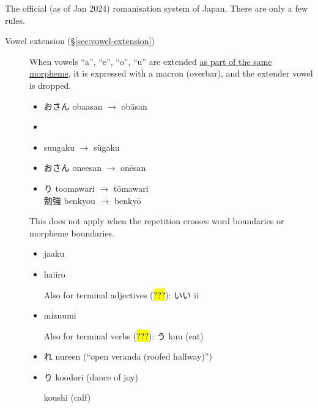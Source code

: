 \documentclass[../nihongo-gakushuu-kyouzai.tex]{subfiles}
\begin{document}
The official (as of Jan 2024) romanisation system of Japan. There are only a few rules.
\begin{description}
    \item[Vowel extension (\S\ref{sec:vowel-extension})] When vowels ``a'', ``e'', ``o'', ``u'' are extended \ul{as part of the same morpheme}, it is expressed with a macron (overbar), and the extender vowel is dropped. 

    \begin{itemize}
        \item おさん obaasan $\to$ ob\=asan
        \item {}
        \item {} suugaku $\to$ s\=ugaku
        \item おさん oneesan $\to$ on\=esan\\
        \item {}り toomawari $\to$ t\=omawari\\
        勉強 benkyou $\to$ benky\=o
    \end{itemize}

    This does not apply when the repetition crosses word boundaries or morpheme boundaries.

    \begin{itemize}
        \item {} jaaku
        \item {} haiiro

        Also for terminal adjectives (\hl{???}): いい ii
        \item {} mizuumi

        Also for terminal verbs (\hl{???}): う kuu (eat)
        \item {}れ nureen (``open veranda (roofed hallway)'')
        \item {}り koodori (dance of joy)

         koushi (calf)


\end{itemize}
\end{description}
\end{document}
